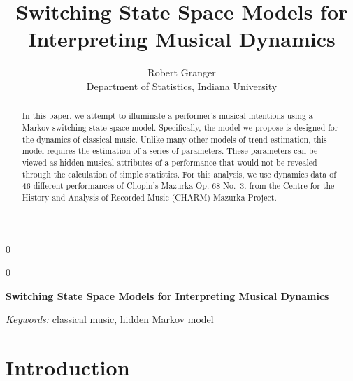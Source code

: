 \documentclass[12pt]{article}
\newcommand{\blind}{0}
\begin{document}
\def\spacingset#1{\renewcommand{\baselinestretch}%
{#1}\small\normalsize} \spacingset{1}



\blind
{
  \title{\bf Switching State Space Models for Interpreting Musical Dynamics}

  \author{
        Robert Granger \\
    Department of Statistics, Indiana University\\
      }
  \maketitle
} \fi

\blind
{
  \bigskip
  \bigskip
  \bigskip
  \begin{center}
    {\LARGE\bf Switching State Space Models for Interpreting Musical Dynamics}
  \end{center}
  \medskip
} \fi

\bigskip
\begin{abstract}
In this paper, we attempt to illuminate a performer's musical intentions
using a Markov-switching state space model. Specifically, the model we
propose is designed for the dynamics of classical music. Unlike many
other models of trend estimation, this model requires the estimation of
a series of parameters. These parameters can be viewed as hidden musical
attributes of a performance that would not be revealed through the
calculation of simple statistics. For this analysis, we use dynamics
data of 46 different performances of Chopin's Mazurka Op. 68 No.~3. from
the Centre for the History and Analysis of Recorded Music (CHARM)
Mazurka Project.
\end{abstract}

\noindent%
{\it Keywords:} classical music, hidden Markov model
\vfill

\newpage
\spacingset{1.45} %

\def\algorithmautorefname{Algorithm}

\hypertarget{introduction}{%
\section{Introduction}\label{introduction}}
\end{document}
